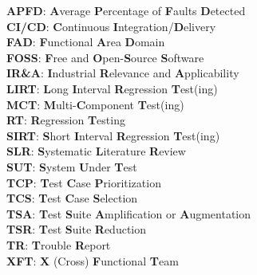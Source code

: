\documentclass[11pt, a4paper, twoside]{Thesis} %
\begin{document}
\clearpage %
{
\textbf{APFD}: \textbf{A}verage \textbf{P}ercentage of \textbf{F}aults \textbf{D}etected\\
\textbf{CI/CD}: \textbf{C}ontinuous \textbf{I}ntegration/\textbf{D}elivery \\
\textbf{FAD}: \textbf{F}unctional \textbf{A}rea \textbf{D}omain \\
\textbf{FOSS}: \textbf{F}ree and \textbf{O}pen-\textbf{S}ource \textbf{S}oftware \\
\textbf{IR\&A}: \textbf{I}ndustrial \textbf{R}elevance and \textbf{A}pplicability \\
\textbf{LIRT}: \textbf{L}ong \textbf{I}nterval \textbf{R}egression \textbf{T}est(ing) \\
\textbf{MCT}: \textbf{M}ulti-\textbf{C}omponent \textbf{T}est(ing) \\
\textbf{RT}: \textbf{R}egression \textbf{T}esting \\
\textbf{SIRT}: \textbf{S}hort \textbf{I}nterval \textbf{R}egression \textbf{T}est(ing) \\
\textbf{SLR}: \textbf{S}ystematic \textbf{L}iterature \textbf{R}eview \\
\textbf{SUT}: \textbf{S}ystem \textbf{U}nder \textbf{T}est \\
\textbf{TCP}: \textbf{T}est \textbf{C}ase \textbf{P}rioritization \\
\textbf{TCS}: \textbf{T}est \textbf{C}ase \textbf{S}election \\
\textbf{TSA}: \textbf{T}est \textbf{S}uite \textbf{A}mplification or \textbf{A}ugmentation \\
\textbf{TSR}: \textbf{T}est \textbf{S}uite \textbf{R}eduction \\
\textbf{TR}: \textbf{T}rouble \textbf{R}eport \\
\textbf{XFT}: \textbf{X} (Cross) \textbf{F}unctional \textbf{T}eam \\



}
\end{document}
